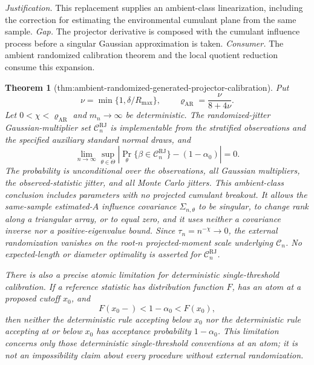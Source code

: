 \documentclass{article}
\newtheorem{theorem}{Theorem}
\begin{document}
\par\smallskip\noindent \textit{Justification.} This replacement supplies an ambient-class linearization, including the correction for estimating the environmental cumulant plane from the same sample. \textit{Gap.} The projector derivative is composed with the cumulant influence process before a singular Gaussian approximation is taken. \textit{Consumer.} The ambient randomized calibration theorem and the local quotient reduction consume this expansion.

\begin{theorem}[thm:ambient-randomized-generated-projector-calibration]\label{thm:ambient-randomized-generated-projector-calibration}
Put
\[
 \nu=\min\{1,\delta/R_{\max}\},
 \qquad
 \varrho_{\mathrm{AR}}=\frac{\nu}{8+4\nu}.
\]
Let \(0<\chi<\varrho_{\mathrm{AR}}\) and \(m_n\to\infty\) be deterministic.  The randomized-jitter Gaussian-multiplier set \(\mathcal C_n^{\mathrm{RJ}}\) is implementable from the stratified observations and the specified auxiliary standard normal draws, and
\[
 \lim_{n\to\infty}
 \sup_{\theta\in\Theta}
 \left|
 \Pr_\theta\{\beta\in\mathcal C_n^{\mathrm{RJ}}\}
 -(1-\alpha_0)
 \right|=0.
\]
The probability is unconditional over the observations, all Gaussian multipliers, the observed-statistic jitter, and all Monte Carlo jitters.  This ambient-class conclusion includes parameters with no projected cumulant breakout.  It allows the same-sample estimated-\(A\) influence covariance \(\Sigma_{n,\theta}\) to be singular, to change rank along a triangular array, or to equal zero, and it uses neither a covariance inverse nor a positive-eigenvalue bound.  Since \(\tau_n=n^{-\chi}\to0\), the external randomization vanishes on the root-\(n\) projected-moment scale underlying \(\mathcal C_n\).  No expected-length or diameter optimality is asserted for \(\mathcal C_n^{\mathrm{RJ}}\).

There is also a precise atomic limitation for deterministic single-threshold calibration.  If a reference statistic has distribution function \(F\), has an atom at a proposed cutoff \(x_0\), and
\[
 F(x_0-)<1-\alpha_0<F(x_0),
\]
then neither the deterministic rule accepting below \(x_0\) nor the deterministic rule accepting at or below \(x_0\) has acceptance probability \(1-\alpha_0\).  This limitation concerns only those deterministic single-threshold conventions at an atom; it is not an impossibility claim about every procedure without external randomization.
\end{theorem}
\end{document}
